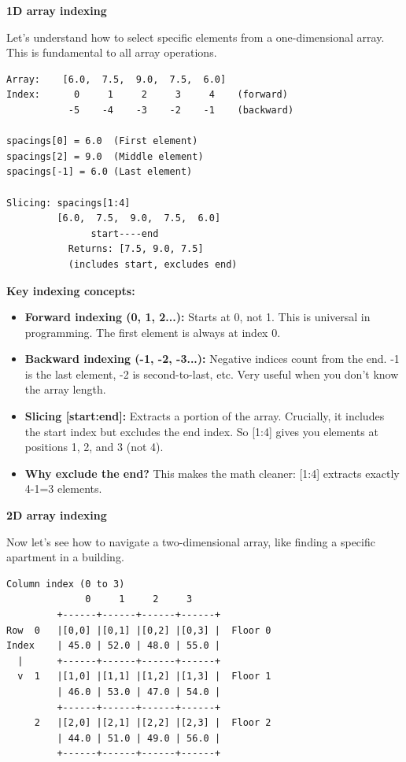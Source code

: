 \begin{tcolorbox}[
    title=Visual guide to array indexing,
    colframe=purple,
    colback = white,
    arc=2mm,
    breakable
]
\textbf{1D array indexing}

Let's understand how to select specific elements from a one-dimensional array. This is fundamental to all array operations.

\begin{lstlisting}[basicstyle=\ttfamily\footnotesize,breaklines=true,columns=fullflexible,keepspaces=true,xleftmargin=0pt]
Array:    [6.0,  7.5,  9.0,  7.5,  6.0]
Index:      0     1     2     3     4    (forward)
           -5    -4    -3    -2    -1    (backward)

spacings[0] = 6.0  (First element)
spacings[2] = 9.0  (Middle element)  
spacings[-1] = 6.0 (Last element)

Slicing: spacings[1:4]
         [6.0,  7.5,  9.0,  7.5,  6.0]
               start----end
           Returns: [7.5, 9.0, 7.5]
           (includes start, excludes end)
\end{lstlisting}

\textbf{Key indexing concepts:}
\begin{itemize}
\item \textbf{Forward indexing (0, 1, 2...):} Starts at 0, not 1. This is universal in programming. The first element is always at index 0.
\item \textbf{Backward indexing (-1, -2, -3...):} Negative indices count from the end. -1 is the last element, -2 is second-to-last, etc. Very useful when you don't know the array length.
\item \textbf{Slicing [start:end]:} Extracts a portion of the array. Crucially, it includes the start index but excludes the end index. So [1:4] gives you elements at positions 1, 2, and 3 (not 4).
\item \textbf{Why exclude the end?} This makes the math cleaner: [1:4] extracts exactly 4-1=3 elements.
\end{itemize}
\vspace{2em}
\textbf{2D array indexing}

Now let's see how to navigate a two-dimensional array, like finding a specific apartment in a building.

\begin{lstlisting}[basicstyle=\ttfamily\footnotesize,breaklines=true,columns=fullflexible,keepspaces=true,xleftmargin=0pt]
                Column index (0 to 3)
              0     1     2     3
         +------+------+------+------+
Row  0   |[0,0] |[0,1] |[0,2] |[0,3] |  Floor 0
Index    | 45.0 | 52.0 | 48.0 | 55.0 |
  |      +------+------+------+------+
  v  1   |[1,0] |[1,1] |[1,2] |[1,3] |  Floor 1
         | 46.0 | 53.0 | 47.0 | 54.0 |
         +------+------+------+------+
     2   |[2,0] |[2,1] |[2,2] |[2,3] |  Floor 2
         | 44.0 | 51.0 | 49.0 | 56.0 |
         +------+------+------+------+


\end{lstlisting}
\end{tcolorbox}
